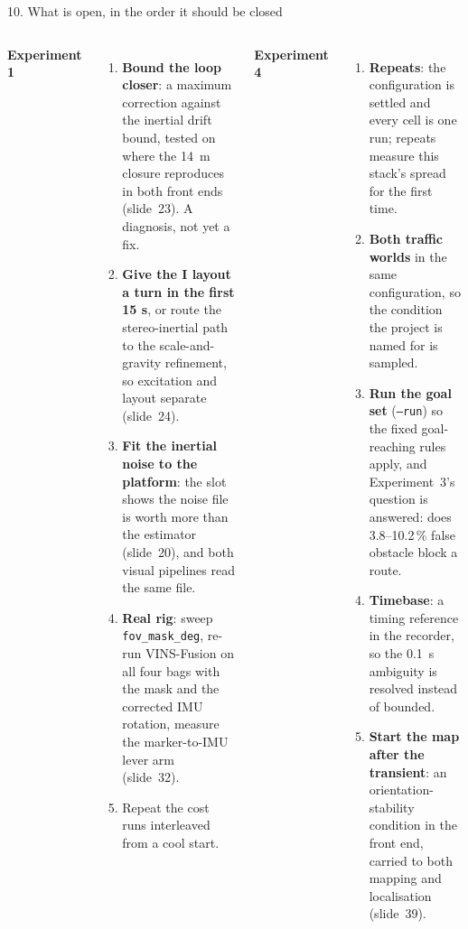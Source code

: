 \documentclass[11pt,aspectratio=169]{beamer}
\newcommand{\repo}[1]{\texttt{\detokenize{#1}}}
\begin{document}
\begin{frame}{10. What is open, in the order it should be closed}
  \scriptsize
  \begin{columns}[T]
      \textbf{Experiment 1}
      \begin{enumerate}
        \item \textbf{Bound the loop closer}: a maximum correction against the
              inertial drift bound, tested on \repo{realistic_001} where the
              \SI{14}{\metre} closure reproduces in both front ends
              (slide~23). A diagnosis, not yet a fix.
        \item \textbf{Give the I layout a turn in the first 15 s}, or route
              the stereo-inertial path to the scale-and-gravity refinement, so
              excitation and layout separate (slide~24).
        \item \textbf{Fit the inertial noise to the platform}: the slot
              shows the noise file is worth more than the estimator
              (slide~20), and both visual pipelines read the same file.
        \item \textbf{Real rig}: sweep \texttt{fov\_mask\_deg}, re-run
              VINS-Fusion on all four bags with the mask and the corrected
              IMU rotation, measure the marker-to-IMU lever arm (slide~32).
        \item Repeat the cost runs interleaved from a cool start.
      \end{enumerate}
      \textbf{Experiment 4}
      \begin{enumerate}
        \item \textbf{Repeats}: the configuration is settled and every cell is
              one run; repeats measure this stack's spread for the first time.
        \item \textbf{Both traffic worlds} in the same configuration, so the
              condition the project is named for is sampled.
        \item \textbf{Run the goal set} (\texttt{--run}) so the fixed
              goal-reaching rules apply, and Experiment~3's question is
              answered: does 3.8--10.2\,\% false obstacle block a route.
        \item \textbf{Timebase}: a timing reference in the recorder, so the
              \SI{0.1}{\second} ambiguity is resolved instead of bounded.
        \item \textbf{Start the map after the transient}: an
              orientation-stability condition in the front end, carried to
              both mapping and localisation (slide~39).
      \end{enumerate}
  \end{columns}
\end{frame}
\end{document}
